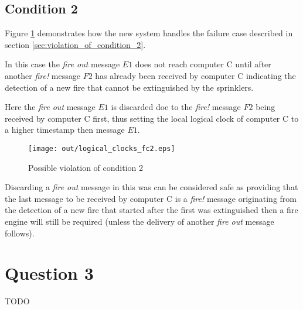 \documentclass[twocolumn]{article}
\begin{document}
\subsection{Condition 2}

Figure \ref{fig:logical_clocks_fc2} demonstrates how the new system handles the
failure case described in section \ref{sec:violation_of_condition_2}.

In this case the \textit{fire out} message $E1$ does not reach computer C until
after another \textit{fire!} message $F2$ has already been received by computer
C indicating the detection of a new fire that cannot be extinguished by the
sprinklers.

Here the \textit{fire out} message $E1$ is discarded doe to the \textit{fire!}
message $F2$ being received by computer C first, thus setting the local logical
clock of computer C to a higher timestamp then message $E1$.

\begin{figure}[h!]
  \centering
  \texttt{[image: out/logical\_clocks\_fc2.eps]}
  \caption{Possible violation of condition 2}
  \label{fig:logical_clocks_fc2}
\end{figure}

Discarding a \textit{fire out} message in this was can be considered safe as
providing that the last message to be received by computer C is a \textit{fire!}
message originating from the detection of a new fire that started after the
first was extinguished then a fire engine will still be required (unless the
delivery of another \textit{fire out} message follows).

\section{Question 3}

TODO
\end{document}

